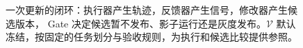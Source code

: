\begin{figure}[htbp]
\centering

\caption{一次更新的闭环：执行器产生轨迹，反馈器产生信号，修改器产生候选版本，
Gate 决定候选暂不发布、影子运行还是灰度发布。$\mathcal V$ 默认冻结，按固定的任务划分与验收规则，为执行和候选比较提供参照。}
\label{fig:ch02-loop}
\end{figure}
